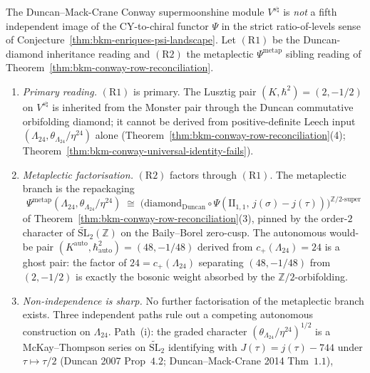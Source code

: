 \begin{theorem}
\label{thm:bkm-conway-psi-fifth-image-resolved}
The Duncan--Mack-Crane Conway supermoonshine module
$V^{s\natural}$ is \emph{not} a fifth independent image of the
CY-to-chiral functor $\Psi$ in the strict ratio-of-levels sense
of Conjecture~\ref{thm:bkm-enriques-psi-landscape}. Let
$(\mathrm{R1})$ be the Duncan-diamond inheritance reading and
$(\mathrm{R2})$ the metaplectic $\Psi^{\mathrm{metap}}$ sibling
reading of Theorem~\ref{thm:bkm-conway-row-reconciliation}.
\begin{enumerate}[label=\textup{(\roman*)}]
\item \emph{Primary reading.}
$(\mathrm{R1})$ is primary. The Lusztig pair
$(K,\hbar^2) = (2,-1/2)$ on $V^{s\natural}$ is inherited from
the Monster pair through the Duncan commutative orbifolding
diamond; it cannot be derived from positive-definite Leech input
$(\Lambda_{24},\theta_{\Lambda_{24}}/\eta^{24})$ alone
(Theorem~\ref{thm:bkm-conway-row-reconciliation}\textup{(4)};
Theorem~\ref{thm:bkm-conway-universal-identity-fails}).
\item \emph{Metaplectic factorisation.}
$(\mathrm{R2})$ factors through $(\mathrm{R1})$. The metaplectic
branch is the repackaging
\[
 \Psi^{\mathrm{metap}}(\Lambda_{24},\theta_{\Lambda_{24}}/\eta^{24})
 \;\cong\;
 \bigl(\mathrm{diamond}_{\mathrm{Duncan}}\circ
 \Psi(\mathrm{II}_{1,1},\, j(\sigma)-j(\tau))\bigr)^{\mathbb{Z}/2\text{-}\mathrm{super}}
\]
of Theorem~\ref{thm:bkm-conway-row-reconciliation}\textup{(3)},
pinned by the order-$2$ character of
$\widetilde{\mathrm{SL}}_2(\mathbb{Z})$ on the Baily--Borel
zero-cusp. The autonomous would-be pair
$(K^{\mathrm{auto}},\hbar^2_{\mathrm{auto}}) = (48,-1/48)$
derived from $c_+(\Lambda_{24}) = 24$ is a ghost pair: the
factor of $24 = c_+(\Lambda_{24})$ separating $(48,-1/48)$ from
$(2,-1/2)$ is exactly the bosonic weight absorbed by the
$\mathbb{Z}/2$-orbifolding.
\item \emph{Non-independence is sharp.} No further factorisation
of the metaplectic branch exists. Three independent paths rule
out a competing autonomous construction on $\Lambda_{24}$.
Path~(i): the graded character
$(\theta_{\Lambda_{24}}/\eta^{24})^{1/2}$ is a
McKay--Thompson series on $\widetilde{\mathrm{SL}}_2$ identifying
with $J(\tau) = j(\tau) - 744$ under $\tau\mapsto\tau/2$
(Duncan 2007 Prop~$4.2$; Duncan--Mack-Crane 2014 Thm~$1.1$),

\end{enumerate}
\end{theorem}

